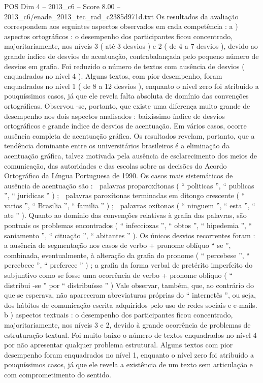 \begin{textsample}{POS Dim 4 – 2013\_c6 – Score 8.00 – 2013\_c6/enade\_2013\_tec\_rad\_c2385d971d.txt}
Os resultados da avaliação correspondem aos seguintes aspectos observados em cada competência : a ) aspectos ortográficos : o desempenho dos participantes ficou concentrado, majoritariamente, nos níveis 3 ( até 3 desvios ) e 2 ( de 4 a 7 desvios ), devido ao grande índice de desvios de acentuação, contrabalançada pelo pequeno número de desvios em grafia.
Foi reduzido o número de textos com ausência de desvios ( enquadrados no nível 4 ).
Alguns textos, com pior desempenho, foram enquadrados no nível 1 ( de 8 a 12 desvios ), enquanto o nível zero foi atribuído a pouquíssimos casos, já que ele revela falta absoluta de domínio das convenções ortográficas.
Observou -se, portanto, que existe uma diferença muito grande de desempenho nos dois aspectos analisados : baixíssimo índice de desvios ortográficos e grande índice de desvios de acentuação.
Em vários casos, ocorre ausência completa de acentuação gráfica.
Os resultados revelam, portanto, que a tendência dominante entre os universitários brasileiros é a eliminação da acentuação gráfica, talvez motivada pela ausência de esclarecimento dos meios de comunicação, das autoridades e das escolas sobre as decisões do Acordo Ortográfico da Língua Portuguesa de 1990.
Os casos mais sistemáticos de ausência de acentuação são :  palavras proparoxítonas ( “ politicas ”, “ publicas ”, “ juridicas ” ) ;  palavras paroxítonas terminadas em ditongo crescente ( “ varios ”, “ Brasilia ”, “ familia ” ) ;  palavras oxítonas ( “ ninguem ”, “ esta ”, “ ate ” ).
Quanto ao domínio das convenções relativas à grafia das palavras, são pontuais os problemas encontrados ( “ infecciozas ”, “ obtos ”, “ hipedemia ”, “ saniamento ”, “ cituação ”, “ abitantes ” ).
Os únicos desvios recorrentes foram : a ausência de segmentação nos casos de verbo + pronome oblíquo “ se ”, combinada, eventualmente, à alteração da grafia do pronome ( “ percebese ”, “ percebece ”, “ preferece ” ) ; a grafia da forma verbal de pretérito imperfeito do subjuntivo como se fosse uma ocorrência de verbo + pronome oblíquo ( “ distribui -se ” por “ distribuísse ” ) Vale observar, também, que, ao contrário do que se esperava, não apareceram abreviaturas próprias do “ internetês ”, ou seja, dos hábitos de comunicação escrita adquiridos pelo uso de redes sociais e e-mails. b ) aspectos textuais : o desempenho dos participantes ficou concentrado, majoritariamente, nos níveis 3 e 2, devido à grande ocorrência de problemas de estruturação textual.
Foi muito baixo o número de textos enquadrados no nível 4 por não apresentar qualquer problema estrutural.
Alguns textos com pior desempenho foram enquadrados no nível 1, enquanto o nível zero foi atribuído a pouquíssimos casos, já que ele revela a existência de um texto sem articulação e com comprometimento do sentido.

\end{textsample}
